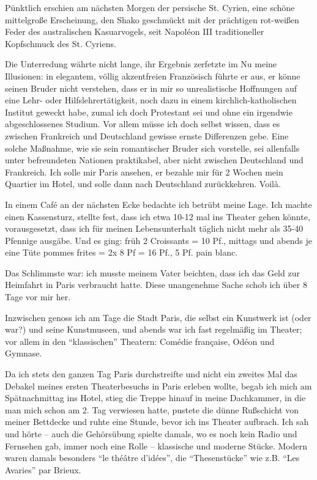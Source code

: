 \documentclass[a5paper,pagesize,10pt,twoside=true]{scrbook}
\renewcommand{\marginpar}[2][]{}
\begin{document}
Pünktlich erschien am nächsten Morgen der persische St. Cyrien, eine schöne mittelgroße Erscheinung, den Shako geschmückt mit der prächtigen rot-weißen Feder des australischen Kasuarvogels, seit Napoléon III traditioneller Kopfschmuck des St. Cyriens.

\marginpar{133}
Die Unterredung währte nicht lange, ihr Ergebnis zerfetzte im Nu meine Illusionen: in elegantem, völlig akzentfreien Französisch führte er aus, er könne seinen Bruder nicht verstehen, dass er in mir so unrealistische Hoffnungen auf eine Lehr- oder Hilfslehrertätigkeit, noch dazu in einem kirchlich-katholischen Institut geweckt habe, zumal ich doch Protestant sei und ohne ein irgendwie abgeschlossenes Studium. Vor allem müsse ich doch selbst wissen, dass es zwischen Frankreich und Deutschland gewisse ernste Differenzen gebe. Eine solche Maßnahme, wie sie sein romantischer Bruder sich vorstelle, sei allenfalls unter befreundeten Nationen praktikabel, aber nicht zwischen Deutschland und Frankreich. Ich solle mir Paris ansehen, er bezahle mir für 2 Wochen mein Quartier im Hotel, und solle dann nach Deutschland zurückkehren. Voilà.

In einem Café an der nächsten Ecke bedachte ich betrübt meine Lage. Ich machte einen Kassensturz, stellte fest, dass ich etwa 10-12 mal ins Theater gehen könnte, vorausgesetzt, dass ich für meinen Lebensunterhalt täglich nicht mehr als 35-40 Pfennige ausgäbe. Und es ging: früh 2 Croissants = 10 Pf., mittags und abends je eine Tüte pommes frites = 2x 8 Pf = 16 Pf., 5 Pf. pain blanc.

Das Schlimmste war: ich musste meinem Vater beichten, dass ich das Geld zur Heimfahrt in Paris verbraucht hatte. Diese unangenehme Sache schob ich über 8 Tage vor mir her.

Inzwischen genoss ich am Tage die Stadt Paris, die selbst ein Kunstwerk ist (oder war?) und seine Kunstmuseen, und abends war ich fast regelmäßig im Theater; vor allem in den \enquote{klassischen} Theatern: Comédie française, Odéon und Gymnase.

Da ich stets den ganzen Tag Paris durchstreifte und nicht ein zweites Mal das Debakel meines ersten Theaterbesuchs in Paris erleben wollte, begab ich mich am Spätnachmittag ins Hotel, stieg die Treppe hinauf in meine Dachkammer, in die man mich schon am 2. Tag verwiesen hatte, pustete die dünne Rußschicht von meiner Bettdecke und ruhte eine Stunde, bevor ich ins Theater aufbrach. Ich sah und hörte -- auch die Gehörsübung spielte damals, wo es noch kein Radio und Fernsehen gab, immer noch eine Rolle -- klassische und moderne Stücke. Modern waren damals besonders \enquote{le théâtre d'idées}, die \enquote{Thesenstücke} wie z.B. \enquote{Les Avaries} par Brieux.
\end{document}
